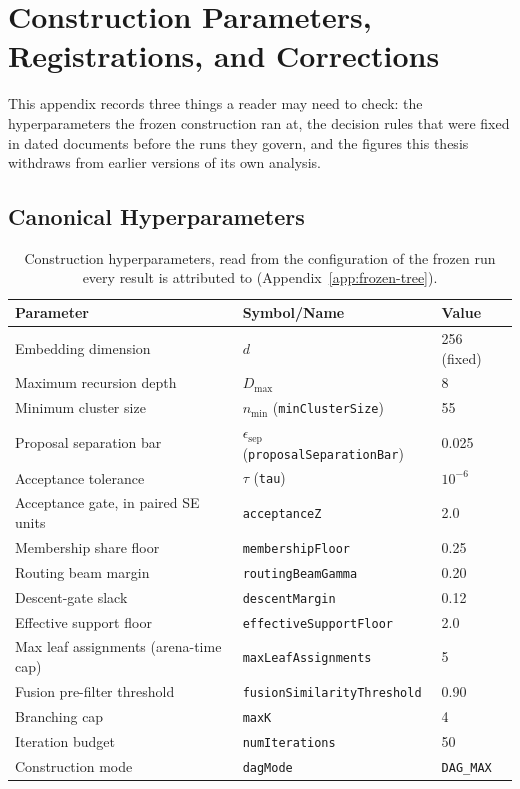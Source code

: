 \chapter{Construction Parameters, Registrations, and Corrections}\label{app:tuning-protocol}

This appendix records three things a reader may need to check: the
hyperparameters the frozen construction ran at, the decision rules that were
fixed in dated documents before the runs they govern, and the figures this
thesis withdraws from earlier versions of its own analysis.

\section{Canonical Hyperparameters}\label{sec:app-hyperparams}

\begin{table}[htbp]
\centering
\caption{Construction hyperparameters, read from the configuration of the
frozen run every result is attributed to (Appendix~\ref{app:frozen-tree}).}
\label{tab:hyperparams}
\begin{tabular}{lll}
\toprule
Parameter & Symbol/Name & Value \\
\midrule
Embedding dimension & $d$ & 256 (fixed) \\
Maximum recursion depth & $D_{\max}$ & 8 \\
Minimum cluster size & $n_{\min}$ (\texttt{minClusterSize}) & 55 \\
Proposal separation bar & $\epsilon_{\text{sep}}$ (\texttt{proposalSeparationBar}) & 0.025 \\
Acceptance tolerance & $\tau$ (\texttt{tau}) & $10^{-6}$ \\
Acceptance gate, in paired SE units & \texttt{acceptanceZ} & 2.0 \\
Membership share floor & \texttt{membershipFloor} & 0.25 \\
Routing beam margin & \texttt{routingBeamGamma} & 0.20 \\
Descent-gate slack & \texttt{descentMargin} & 0.12 \\
Effective support floor & \texttt{effectiveSupportFloor} & 2.0 \\
Max leaf assignments (arena-time cap) & \texttt{maxLeafAssignments} & 5 \\
Fusion pre-filter threshold & \texttt{fusionSimilarityThreshold} & 0.90 \\
Branching cap & \texttt{maxK} & 4 \\
Iteration budget & \texttt{numIterations} & 50 \\
Construction mode & \texttt{dagMode} & \texttt{DAG\_MAX} \\
\bottomrule
\end{tabular}
\end{table}

